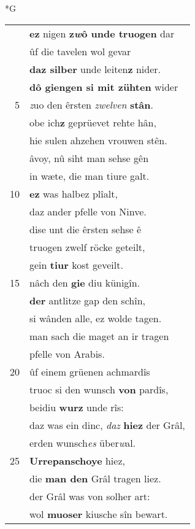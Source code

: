 \documentclass[8pt,a4paper,notitlepage]{article}
\begin{document}
\newpage
\begin{table}[ht]
\begin{minipage}[t]{0.5\linewidth}
\small
\begin{center}*G
\end{center}
\begin{tabular}{rl}
 & \textbf{ez} nigen \textbf{z\textit{w}ô unde truogen} dar\\ 
 & ûf die tavelen wol gevar\\ 
 & \textbf{daz silber} unde leiten\textbf{z} nider.\\ 
 & \textbf{dô giengen si mit zühten} wider\\ 
5 & \textit{z}uo den êrsten \textit{zwelven} \textbf{stân}.\\ 
 & obe ich\textbf{z} geprüevet rehte hân,\\ 
 & hie sulen ahzehen vrouwen stên.\\ 
 & âvoy, nû siht man sehse gên\\ 
 & in wæte, die man tiure galt.\\ 
10 & \textbf{ez} was halbez plîalt,\\ 
 & daz ander pfelle von Ninve.\\ 
 & dise unt die êrsten sehse ê\\ 
 & truogen zwelf röcke geteilt,\\ 
 & gein \textbf{tiur} kost geveilt.\\ 
15 & nâch den \textbf{gie} diu künigîn.\\ 
 & \textbf{der} antlitze gap den schîn,\\ 
 & si wânden alle, ez wolde tagen.\\ 
 & man sach die maget an ir tragen\\ 
 & pfelle von Arabis.\\ 
20 & ûf einem grüenen achmardîs\\ 
 & truoc si den wunsch \textbf{von} pardîs,\\ 
 & beidiu \textbf{wurz} unde rîs:\\ 
 & daz was ein dinc, \textit{daz} \textbf{hiez} der Grâl,\\ 
 & erden wunsch\textit{es} über\textit{w}al.\\ 
25 & \textbf{Urrepanschoye} hiez,\\ 
 & die \textbf{man den} Grâl tragen liez.\\ 
 & der Grâl was von solher art:\\ 
 & wol \textbf{muoser} kiusche sîn bewart.\\ 

\end{tabular}
\end{minipage}
\end{table}
\end{document}
